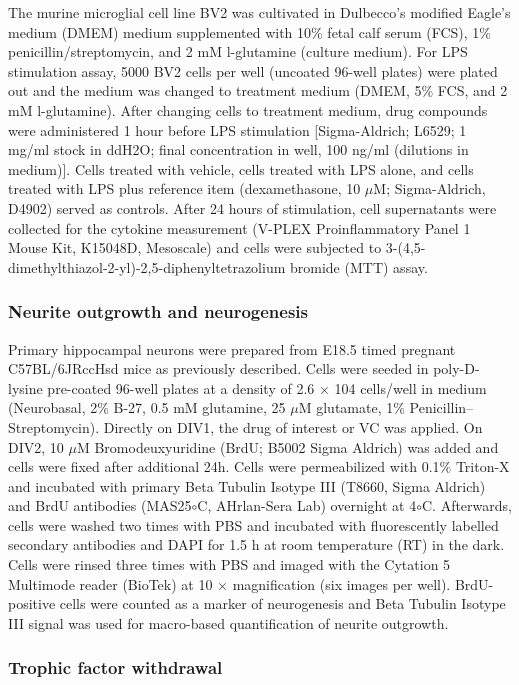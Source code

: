 \documentclass[letterpaper]{article}
\begin{document}
The murine microglial cell line BV2 was cultivated in Dulbecco’s modified
Eagle's medium (DMEM) medium supplemented with 10\% fetal calf serum (FCS),
1\% penicillin/streptomycin, and 2 mM l-glutamine (culture medium). For LPS
stimulation assay, 5000 BV2 cells per well (uncoated 96-well plates) were
plated out and the medium was changed to treatment medium (DMEM, 5\% FCS, and
2 mM l-glutamine). After changing cells to treatment medium, drug compounds
were administered 1 hour before LPS stimulation [Sigma-Aldrich; L6529; 1 mg/ml
stock in ddH2O; final concentration in well, 100 ng/ml (dilutions in medium)].
Cells treated with vehicle, cells treated with LPS alone, and cells treated
with LPS plus reference item (dexamethasone, 10 $\mu$M; Sigma-Aldrich, D4902)
served as controls. After 24 hours of stimulation, cell supernatants were
collected for the cytokine measurement (V-PLEX Proinflammatory Panel 1 Mouse
Kit, K15048D, Mesoscale) and cells were subjected to
3-(4,5-dimethylthiazol-2-yl)-2,5-diphenyltetrazolium bromide (MTT) assay.

\subsubsection{Neurite outgrowth and neurogenesis}

Primary hippocampal neurons were prepared from E18.5 timed pregnant
C57BL/6JRccHsd mice as previously described. Cells were seeded in
poly-D-lysine pre-coated 96-well plates at a density of 2.6 $\times$ 104
cells/well in medium (Neurobasal,
2\% B-27, 0.5 mM glutamine, 25 $\mu$M glutamate,
1\% Penicillin–Streptomycin). Directly on DIV1, the drug of interest or VC was
applied. On DIV2, 10 $\mu$M Bromodeuxyuridine (BrdU; B5002 Sigma Aldrich) was
added and cells were fixed after additional 24h. Cells were permeabilized with
0.1\% Triton-X and incubated with primary Beta Tubulin Isotype III (T8660,
Sigma Aldrich) and BrdU antibodies (MAS25$\circ$C, AHrlan-Sera Lab) overnight
at 4$\circ$C. Afterwards, cells were washed two times with PBS and incubated
with fluorescently labelled secondary antibodies and DAPI for 1.5 h at room
temperature (RT) in the dark. Cells were rinsed three times with PBS and
imaged with the Cytation 5 Multimode reader (BioTek) at 10 $\times$
magnification (six images per well). BrdU-positive cells were counted as a
marker of neurogenesis and Beta Tubulin Isotype III signal was used for
macro-based quantification of neurite outgrowth.

\subsubsection{Trophic factor withdrawal}
\end{document}
